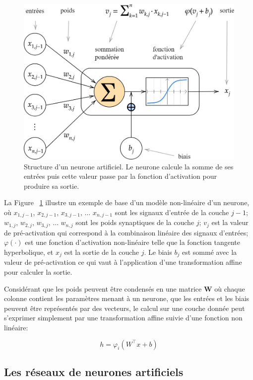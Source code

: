 \begin{figure}[!htbp] 
  \includegraphics[width=0.75\linewidth]{figures/Chap2/neurones-artificiels-diagram.jpg}
   \centering
    \caption{\small Structure d'un neurone artificiel. Le neurone calcule la somme de ses entrées puis cette valeur passe par la fonction d'activation pour produire sa sortie.}
  \label{fig:neurones_artificiels}
\end{figure}

 La Figure ~\ref{fig:neurones_artificiels} illustre un exemple de base d'un modèle non-linéaire d'un neurone, où $x_{1,j-1}$, $x_{2,j-1}$, $x_{3,j-1}$, $\dots$ $x_{n,j-1}$ sont les signaux d'entrée de la couche $j-1$; $w_{1,j}$, $w_{2,j}$, $w_{3,j}$, $\dots$ $w_{n,j}$ sont les poids synaptiques de la couche $j$; $v_j$ est la valeur de pré-activation qui correspond à la combinaison linéaire des signaux d'entrées; $\varphi(\cdot)$ est une fonction d'activation non-linéaire telle que la fonction tangente hyperbolique, et $x_j$ est la sortie de la couche $j$. Le biais $b_j$ est sommé avec la valeur de pré-activation ce qui vaut à l'application d'une transformation affine pour calculer la sortie.
 
 Considérant que les poids peuvent être condensés en une matrice \textbf{W} où chaque colonne contient les paramètres menant à un neurone, que les entrées et les biais peuvent être représentés par des vecteurs, le calcul sur une couche donnée peut s'exprimer simplement par une transformation affine suivie d'une fonction non linéaire:
 
 \begin{equation}
     h = \varphi_i(W^\intercal x + b)
     \label{eq:h_matricielle}
 \end{equation}

\subsection{Les réseaux de neurones artificiels}

